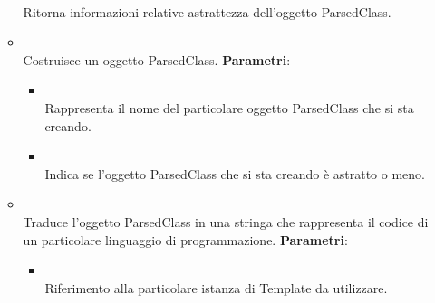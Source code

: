 \begin{itemize}
\begin{itemize}
\\ Ritorna informazioni relative astrattezza dell'oggetto ParsedClass.
\item {}
\\ Costruisce un oggetto ParsedClass.
\textbf{Parametri}:
\begin{itemize}
\item {}
\\ Rappresenta il nome del particolare oggetto ParsedClass che si sta creando.
\item {}
\\ Indica se l'oggetto ParsedClass che si sta creando è astratto o meno.
\end{itemize}
\item {}
\\ Traduce l'oggetto ParsedClass in una stringa che rappresenta il codice di un particolare linguaggio di programmazione.
\textbf{Parametri}:
\begin{itemize}
\item {}
\\ Riferimento alla particolare istanza di Template da utilizzare.
\end{itemize}
\end{itemize}
\end{itemize}

